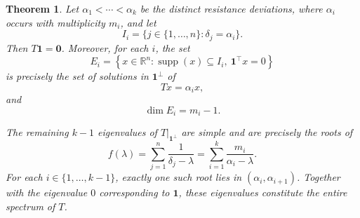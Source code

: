 \documentclass[10pt,a4paper]{amsart}
\newtheorem{theorem}{Theorem}
\begin{document}
\begin{theorem}\label{thm:spectrumT}
Let $\alpha_1<\cdots<\alpha_k$ be the distinct resistance deviations,
where $\alpha_i$ occurs with multiplicity $m_i$, and let
\[
I_i=\{j\in\{1,\ldots,n\}:\delta_j=\alpha_i\}.
\]
Then $T\mathbf{1}=\mathbf{0}$. Moreover, for each $i$, the set
\[
E_i=
\left\{
x\in\mathbb{R}^n:
\operatorname{supp}(x)\subseteq I_i,\ 
\mathbf{1}^{\top}x=0
\right\}
\]
is precisely the set of solutions in $\mathbf{1}^{\perp}$ of
\[
Tx=\alpha_i x,
\]
and
\[
\dim E_i=m_i-1.
\]

The remaining $k-1$ eigenvalues of
$\left.T\right|_{\mathbf{1}^{\perp}}$ are simple and are precisely the
roots of
\[
f(\lambda)
=
\sum_{j=1}^{n}\frac{1}{\delta_j-\lambda}
=
\sum_{i=1}^{k}\frac{m_i}{\alpha_i-\lambda}.
\]
For each $i\in\{1,\ldots,k-1\}$, exactly one such root lies in
$(\alpha_i,\alpha_{i+1})$. Together with the eigenvalue $0$
corresponding to $\mathbf{1}$, these eigenvalues constitute the entire
spectrum of $T$.
\end{theorem}
\end{document}
